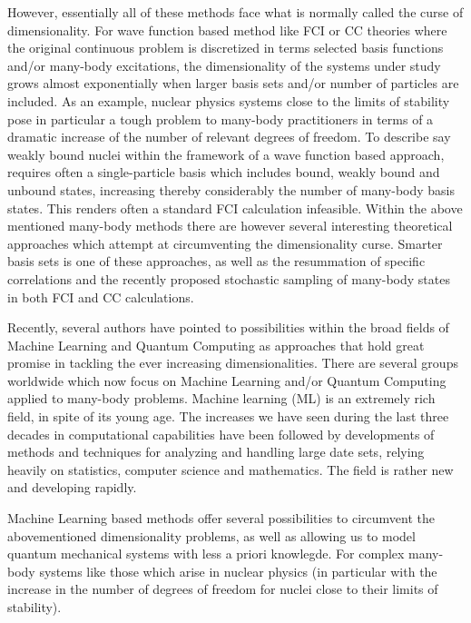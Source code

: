 \documentclass[%
oneside,                 %
final,                   %
10pt]{article}
\begin{document}
However, essentially all of these methods face what is
normally called the curse of dimensionality. For wave function based
method like FCI or CC theories where the original continuous problem
is discretized in terms selected basis functions and/or many-body
excitations, the dimensionality of the systems under study grows almost
exponentially when larger basis sets and/or number of particles are
included. As an example, nuclear physics 
systems close to the limits of stability pose in
particular a tough problem to many-body practitioners in terms of a dramatic
increase of the number of relevant degrees of freedom. To describe say
weakly bound nuclei within the framework of a wave function based
approach, requires often a single-particle basis which includes bound,
weakly bound and unbound states, increasing thereby considerably the
number of many-body basis states. This renders often a standard
FCI calculation infeasible. Within the above mentioned
many-body methods there are however several interesting theoretical
approaches which attempt at circumventing the dimensionality
curse. Smarter basis sets is one of these approaches, as well as the
resummation of specific correlations and the recently proposed
stochastic sampling of many-body states in both FCI and CC
calculations.

Recently, several authors have pointed to  possibilities within the
broad fields of Machine Learning and Quantum Computing as approaches
that hold great promise in tackling the ever increasing
dimensionalities. There are several groups worldwide which now focus
on Machine Learning and/or Quantum Computing applied to many-body
problems.
Machine learning (ML) is an extremely rich field, in spite of its
young age. The increases we have seen during the last three decades in
computational capabilities have been followed by developments of
methods and techniques for analyzing and handling large date sets,
relying heavily on statistics, computer science and mathematics.  The
field is rather new and developing rapidly.

Machine Learning based methods offer several possibilities to
circumvent the abovementioned dimensionality problems, as well as
allowing us to model quantum mechanical systems with less a priori
knowlegde. For complex many-body systems like those which arise in
nuclear physics (in particular with the increase in the number of
degrees of freedom for nuclei close to their limits of stability).
\end{document}
